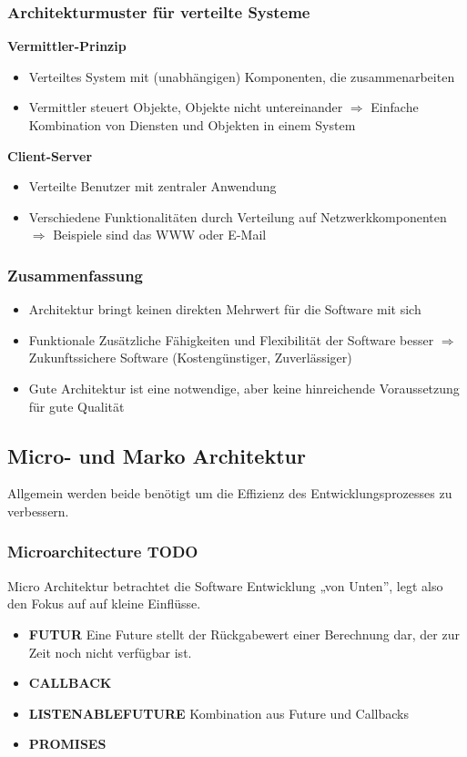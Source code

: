 \documentclass[a4paper,10pt]{scrartcl}
\begin{document}
\subsubsection{Architekturmuster für verteilte Systeme}
\textbf{Vermittler-Prinzip}

\begin{itemize}
    \item Verteiltes System mit (unabhängigen) Komponenten, die zusammenarbeiten 
    \item Vermittler steuert Objekte, Objekte nicht untereinander\newline
    $\Rightarrow$ Einfache Kombination von Diensten und Objekten in einem System
\end{itemize}
\textbf{Client-Server}
\begin{itemize}
    \item Verteilte Benutzer mit zentraler Anwendung 
    \item Verschiedene Funktionalitäten durch Verteilung auf Netzwerkkomponenten\newline
    $\Rightarrow$ Beispiele sind das WWW oder E-Mail 
\end{itemize}
\subsubsection{Zusammenfassung}
\begin{itemize}
    \item Architektur bringt keinen direkten Mehrwert für die Software mit sich
    \item Funktionale Zusätzliche Fähigkeiten und Flexibilität der Software besser\newline
    $\Rightarrow$ Zukunftssichere Software (Kostengünstiger, Zuverlässiger)
    \item Gute Architektur ist eine notwendige, aber keine hinreichende Voraussetzung für gute Qualität
\end{itemize}
\subsection{Micro- und Marko Architektur}
Allgemein werden beide benötigt um die Effizienz des Entwicklungsprozesses zu verbessern.
\subsubsection{Microarchitecture TODO}
Micro Architektur betrachtet die Software Entwicklung „von Unten”, legt also den Fokus auf auf
kleine Einflüsse.
\begin{itemize}
    \item \textbf{FUTUR} Eine Future stellt der Rückgabewert einer Berechnung dar, der zur Zeit noch nicht verfügbar ist.
    \item \textbf{CALLBACK}
    \item \textbf{LISTENABLEFUTURE}  Kombination aus Future und Callbacks
    \item \textbf{PROMISES}
\end{itemize}
\end{document}
